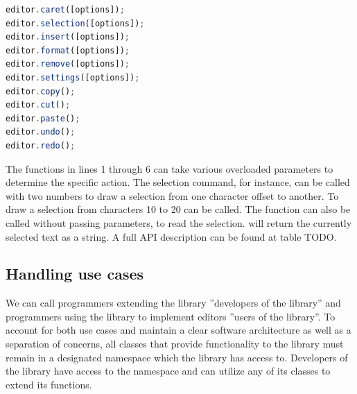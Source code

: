 \begin{lstlisting}[language=JavaScript, caption=API for implementing a rich-text editor, label=lst:rich_text_api]
editor.caret([options]);
editor.selection([options]);
editor.insert([options]);
editor.format([options]);
editor.remove([options]);
editor.settings([options]);
editor.copy();
editor.cut();
editor.paste();
editor.undo();
editor.redo();
\end{lstlisting}

\noindent The functions in lines 1 through 6 can take various overloaded parameters to determine the specific action. The selection command, for instance, can be called with two numbers to draw a selection from one character offset to another. To draw a selection from characters 10 to 20  can be called. The function can also be called without passing parameters, to read the selection.  will return the currently selected text as a string. A full API description can be found at table TODO.




\subsection{Handling use cases}
\label{subsec:api_design_handling_use_cases}

We can call programmers extending the library ''developers of the library'' and programmers using the library to implement editors ''users of the library''. To account for both use cases and maintain a clear software architecture as well as a separation of concerns, all classes that provide functionality to the library must remain in a designated namespace which the library has access to. Developers of the library have access to the namespace and can utilize any of its classes to extend its functions.

